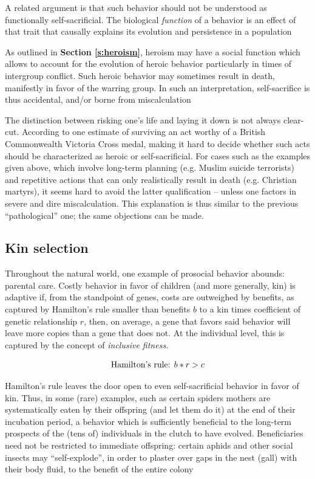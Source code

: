 \documentclass[a4paper,12pt]{report}
\begin{document}
A related argument is that such behavior should not be understood as
functionally self-sacrificial. The biological \emph{function} of a behavior is an effect
of that trait that causally explains its evolution and persistence in a population

As outlined in \textbf{Section \ref{s:heroism}}, heroism may have a social function which
allows to account for the evolution of heroic behavior particularly in times of intergroup
conflict. Such heroic behavior may sometimes result in death, manifestly in favor of
the warring group. In such an interpretation, self-sacrifice is thus accidental, and/or
borne from miscalculation %

The distinction between risking one’s life and laying it down is not always clear-cut.
According to one estimate %
of surviving an act worthy of a British Commonwealth Victoria Cross medal, 
making it hard to decide whether such acts should be characterized as heroic
or self-sacrificial. For cases such as the examples given above,
which involve long-term planning (e.g. Muslim suicide terrorists)
and repetitive actions that can only realistically result in death (e.g. Christian martyrs),
it seems hard to avoid the latter qualification – unless one factors in severe and
dire miscalculation. This explanation is thus similar to the previous “pathological” one;
the same objections can be made.

\subsection{Kin selection}
\label{s:kin}
Throughout the natural world, one example of prosocial behavior abounds: parental care.
Costly behavior in favor of children (and more generally, kin) is adaptive if,
from the standpoint of genes, costs are outweighed by benefits,
as captured by Hamilton’s rule %
smaller than benefits $b$ to a kin times coefficient of genetic relationship $r$,
then, on average, a gene that favors said behavior will leave more copies than a
gene that does not. At the individual level, this is captured by the concept of
\emph{inclusive fitness}.

 \[\textnormal{Hamilton's rule: }b*r > c\]

Hamilton’s rule leaves the door open to even self-sacrificial behavior in favor of kin.
Thus, in some (rare) examples, such as certain spiders %
mothers are systematically eaten by their offspring (and let them do it) at the end of
their incubation period, a behavior which is sufficiently beneficial to the long-term
prospects of the (tens of) individuals in the clutch to have evolved. Beneficiaries
need not be restricted to immediate offspring: certain aphids and other social insects
may “self-explode”, in order to plaster over gaps in the nest (gall) with their body fluid,
to the benefit of the entire colony %
\end{document}
